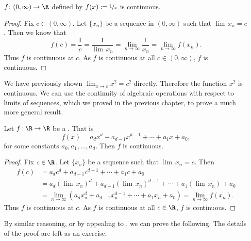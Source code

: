 \documentclass[12pt]{book}
\begin{document}
\begin{example}
$f \colon (0,\infty) \to \R$ defined by
$f(x) := \nicefrac{1}{x}$ is continuous.

\begin{proof} Fix $c \in (0,\infty)$.  
Let $\{ x_n \}$ be a sequence in $(0,\infty)$ such that
$\lim\, x_n = c$.
Then we know that
\begin{equation*}
f(c) = \frac{1}{c}
=
\frac{1}{\lim\, x_n}
=
\lim_{n \to \infty} \frac{1}{x_n}
=
\lim_{n \to \infty} f(x_n) .
\end{equation*}
Thus $f$ is continuous at $c$.
As $f$ is continuous at all $c \in
(0,\infty)$, $f$ is continuous.
\end{proof}
\end{example}

We have previously shown $\lim_{x \to c} x^2 = c^2$ directly.
Therefore
the function $x^2$ is continuous.
We can use the continuity of
algebraic operations with respect to limits of sequences, which we proved in
the previous chapter, to prove a much more general result.

\begin{prop}
Let $f \colon \R \to \R$ be a \emph{}.
That is
\begin{equation*}
f(x) = a_d x^d + a_{d-1} x^{d-1} + \cdots + a_1 x + a_0 ,
\end{equation*}
for some constants $a_0, a_1, \ldots, a_d$.
Then $f$ is continuous.
\end{prop}

\begin{proof}
Fix $c \in \R$.  
Let $\{ x_n \}$ be a sequence such that
$\lim\, x_n = c$.
Then
\begin{equation*}
\begin{split}
f(c) &=
a_d c^d + a_{d-1} c^{d-1} + \cdots + a_1 c + a_0 
\\
&= 
a_d {(\lim\, x_n)}^d + a_{d-1} {(\lim\, x_n)}^{d-1} + \cdots + a_1 (\lim\, x_n) + a_0 
\\
& =
\lim_{n \to \infty}
\left(
a_d x_n^d + a_{d-1} x_n^{d-1} + \cdots + a_1 x_n + a_0 
\right)
=
\lim_{n \to \infty}
f(x_n) .
\end{split}
\end{equation*}
Thus $f$ is continuous at $c$.
As $f$ is continuous at all $c \in \R$,
$f$ is continuous.
\end{proof}

By similar reasoning, or by appealing to ,
we can prove the following.
The details of the proof are left as an
exercise.
\end{document}
